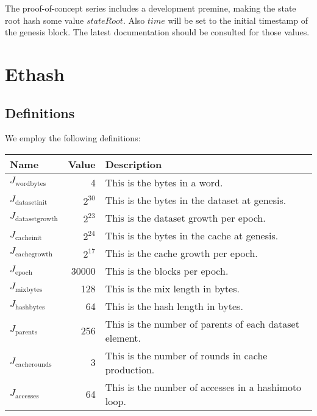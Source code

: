 \documentclass[9pt,oneside]{amsart}
\begin{document}
The proof-of-concept series includes a development premine, making the state root hash some value $stateRoot$. Also \hyperlink{H s}{$time$} will be set to the initial timestamp of the genesis block. The latest documentation should be consulted for those values.

\section{Ethash}\label{app:ethash}
\subsection{Definitions}
We employ the following definitions:

\begin{tabularx}{\textwidth}{lrX}
\toprule
Name & Value & Description \hypertarget{Jwordbytes}{} \\
\midrule
$J_{\mathrm{wordbytes}}$ & 4  & This is the bytes in a word.\hypertarget{Jdatasetinit}{}\\
$J_{\mathrm{datasetinit}}$ & $2^{30}$ & This is the bytes in the dataset at genesis. \hypertarget{Jdatasetgrowth}{} \\
$J_{\mathrm{datasetgrowth}}$ & $2^{23}$ & This is the dataset growth per epoch. \hypertarget{Jcacheinit}{}\\
$J_{\mathrm{cacheinit}}$ & $2^{24}$ & This is the bytes in the cache at genesis.\hypertarget{Jcachegrowth}{}\\
$J_{\mathrm{cachegrowth}}$ & $2^{17}$ & This is the cache growth per epoch.\hypertarget{Jepoch}{}\\
$J_{\mathrm{epoch}}$ & 30000 & This is the blocks per epoch.\hypertarget{Jmixbytes}{}\\
$J_{\mathrm{mixbytes}}$ & 128 & This is the mix length in bytes.\hypertarget{Jhashbytes}{}\\
$J_{\mathrm{hashbytes}}$ & 64 & This is the hash length in bytes.\hypertarget{Jparents}{}\\
$J_{\mathrm{parents}}$ & 256 & This is the number of parents of each dataset element.\hypertarget{Jcacherounds}{}\\
$J_{\mathrm{cacherounds}}$ & 3 & This is the number of rounds in cache production.\hypertarget{Jaccesses}{}\\
$J_{\mathrm{accesses}}$ & 64 & This is the number of accesses in a hashimoto loop.\\
\bottomrule
\end{tabularx}
\end{document}

